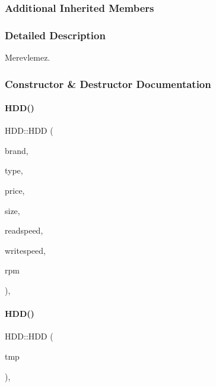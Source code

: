 \subsubsection*{Additional Inherited Members}


\subsubsection{Detailed Description}
Merevlemez. 

\subsubsection{Constructor \& Destructor Documentation}
\mbox{\label{class_h_d_d_a375ad923cb64a11afc261fe1fac5276c}} 
\paragraph{\texorpdfstring{HDD()}{HDD()}\hspace{0.1cm}{\footnotesize\ttfamily [1/2]}}
{\footnotesize\ttfamily H\+D\+D\+::\+H\+DD (\begin{DoxyParamCaption}\item[{\mbox{\hyperlink{class_string}{String}}}]{brand,  }\item[{\mbox{\hyperlink{class_string}{String}}}]{type,  }\item[{int}]{price,  }\item[{int}]{size,  }\item[{int}]{readspeed,  }\item[{int}]{writespeed,  }\item[{int}]{rpm }\end{DoxyParamCaption})\hspace{0.3cm}{\ttfamily [inline]}, {\ttfamily [explicit]}}

\mbox{\label{class_h_d_d_a98374b087d6a74476b914dedb2de1ec4}} 
\paragraph{\texorpdfstring{HDD()}{HDD()}\hspace{0.1cm}{\footnotesize\ttfamily [2/2]}}
{\footnotesize\ttfamily H\+D\+D\+::\+H\+DD (\begin{DoxyParamCaption}\item[{\mbox{\hyperlink{struct_temp_input}{Temp\+Input}}}]{tmp }\end{DoxyParamCaption})\hspace{0.3cm}{\ttfamily [inline]}, {\ttfamily [explicit]}}



